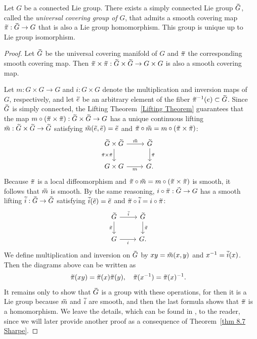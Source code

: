 \begin{thm}\label{thm 7.7. Lee covering group}
    Let $G$ be a connected Lie group. There exists a simply connected Lie group $\wt{G}$, called the \emph{universal covering group of $G$}, that admits a smooth covering map $\wt\pi:\wt{G}\to G$ that is also a Lie group homomorphism. This group is unique up to Lie group isomorphism.
\end{thm}
\begin{proof}
    Let $\wt G$ be the universal covering manifold of $G$ and $\wt\pi$ the corresponding smooth covering map. Then $\wt\pi\times\wt\pi:\wt G\times\wt G\to G\times G$ is also a smooth covering map.

    Let $m:G\times G\to G$ and $i:G\times G$ denote the multiplication and inversion maps of $G$, respectively, and let $\wt e$ be an arbitrary element of the fiber ${\wt\pi}^{-1}(e)\subset \wt{G}$. Since $\wt G$ is simply connected, the Lifting Theorem~\ref{Lifting Theorem} guarantees that the map $m\circ(\wt\pi\times\wt\pi):\wt G\times\wt G\to G$ has a unique continuous lifting $\wt m:\wt G\times\wt G\to \wt G$ satisfying $\wt m(\wt e,\wt e)=\wt e$ and $\wt\pi\circ \wt m=m\circ (\wt\pi\times\wt\pi)$:
    \[
    \begin{tikzcd}[every matrix/.append style={name=m}]
       \wt G\times \wt G \arrow[r,"\wt m"]\arrow[d,"\wt\pi\times\wt\pi",swap] & \wt G\arrow[d,"\wt\pi"]\\
       G\times G \arrow[r,"m", swap] & G.
    \end{tikzcd}
    \]
    Because $\wt\pi$ is a local diffeomorphism and $\wt\pi\circ \wt m=m\circ(\wt\pi\times\wt\pi)$ is smooth, it follows that $\wt m$ is smooth. By the same reasoning, $i\circ\wt\pi:\wt G\to G$ has a smooth lifting $\wt i:\wt G\to \wt G$ satisfying $\wt i(\wt e)=\wt e$ and $\wt\pi\circ \wt i=i\circ \wt\pi$:
    \[
    \begin{tikzcd}[every matrix/.append style={name=m}]
       \wt G \arrow[r,"\wt i"]\arrow[d,"\wt\pi",swap] & \wt G\arrow[d,"\wt\pi"]\\
       G \arrow[r,"i", swap] & G.
    \end{tikzcd}
    \]
    We define multiplication and inversion on $\wt G$ by $xy=\wt m(x,y)$ and $x^{-1}=\wt i(x)$. Then the diagrams above can be written as 
    \[\wt\pi(xy)=\wt\pi(x)\wt\pi(y),\quad \wt\pi(x^{-1})=\wt\pi(x)^{-1}.\label{47328}\]
    It remains only to show that $\wt G$ is a group with these operations, for then it is a Lie group because $\wt m$ and $\wt i$ are smooth, and then the last formula shows that $\wt\pi$ is a homomorphism. We leave the details, which can be found in \cite[Thm.~7.7]{Lee}, to the reader, since we will later provide another proof as a consequence of Theorem~\ref{thm 8.7 Sharpe}.


\end{proof}
